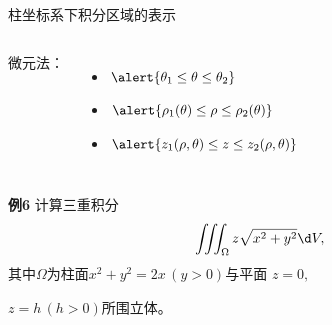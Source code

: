 \begin{frame}{柱坐标系下积分区域的表示}
	\linespread{1.2}
	\begin{columns}\pause 
			{\bb 微元法：}\pause 
			\begin{itemize}
			  \item $\alert{\theta_1\leq\theta\leq\theta_2}$\pause 
			  \item $\alert{\rho_1(\theta)\leq\rho\leq\rho_2(\theta)}$\pause 
			  \item $\alert{z_1(\rho,\theta)\leq z\leq z_2(\rho,\theta)}$\pause 
			\end{itemize}
			\begin{center}
			\end{center}

	\end{columns}
\end{frame}

\begin{frame}
	\linespread{1.2}
	\begin{exampleblock}{{\bf 例6}\hfill}
		计算三重积分
		$$\iiint_{\Omega}z\sqrt{x^2+y^2}\d V,$$
		其中$\Omega$为柱面$x^2+y^2=2x\,(y>0)$与平面
		$z=0,\,$
		
		$z=h\,(h>0)$所围立体。
	\end{exampleblock}
\end{frame}

